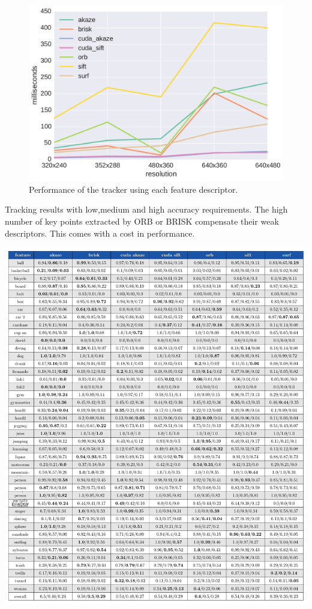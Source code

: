\begin{figure}
	\includegraphics[width=0.95\linewidth]{imgs/tracker_fps.pdf}
\vspace{-2.5mm}	
\caption{Performance of the tracker using each feature descriptor.}
\label{fig:speed}
\end{figure}




\begin{table}[h]
\caption{Tracking results with low,medium and high accuracy requirements. The high number of key points extracted by ORB or BRISK compensate their weak descriptors. This comes with a cost in performance.} 
\centerline{%
		\includegraphics[width=0.98\linewidth]{tables/tracking_precision.pdf}}
    \vspace{-2mm} 
	\label{table:taccuracy}
\end{table}